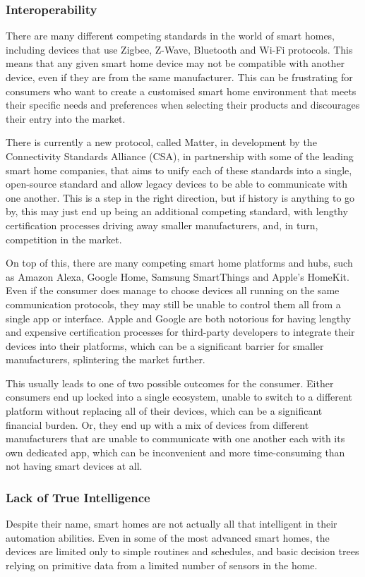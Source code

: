 \subsubsection{Interoperability}
There are many different competing standards in the world of smart homes, including devices that use Zigbee, Z-Wave, Bluetooth and Wi-Fi protocols.
This means that any given smart home device may not be compatible with another device, even if they are from the same manufacturer.
This can be frustrating for consumers who want to create a customised smart home environment that meets their specific needs and preferences when selecting their products and discourages their entry into the market.

There is currently a new protocol, called Matter, in development by the Connectivity Standards Alliance (CSA), in partnership with some of the leading smart home companies, that aims to unify each of these standards into a single, open-source standard and allow legacy devices to be able to communicate with one another.
This is a step in the right direction, but if history is anything to go by, this may just end up being an additional competing standard, with lengthy certification processes driving away smaller manufacturers, and, in turn, competition in the market.

On top of this, there are many competing smart home platforms and hubs, such as Amazon Alexa, Google Home, Samsung SmartThings and Apple's HomeKit.
Even if the consumer does manage to choose devices all running on the same communication protocols, they may still be unable to control them all from a single app or interface.
Apple and Google are both notorious for having lengthy and expensive certification processes for third-party developers to integrate their devices into their platforms, which can be a significant barrier for smaller manufacturers, splintering the market further.

This usually leads to one of two possible outcomes for the consumer.
Either consumers end up locked into a single ecosystem, unable to switch to a different platform without replacing all of their devices, which can be a significant financial burden.
Or, they end up with a mix of devices from different manufacturers that are unable to communicate with one another each with its own dedicated app, which can be inconvenient and more time-consuming than not having smart devices at all.

\subsubsection{Lack of True Intelligence}
Despite their name, smart homes are not actually all that intelligent in their automation abilities.
Even in some of the most advanced smart homes, the devices are limited only to simple routines and schedules, and basic decision trees relying on primitive data from a limited number of sensors in the home.

